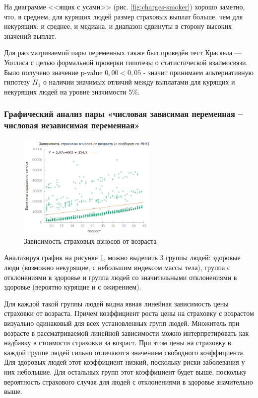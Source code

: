 \documentclass[a4paper,12pt]{article}
\begin{document}
На диаграмме <<ящик с усами>> (рис. \ref{fig:charges-smoker}) хорошо заметно, что, в среднем, для курящих людей размер страховых выплат больше, чем для некурящих: и среднее, и медиана, и диапазон сдвинуты в сторону высоких значений выплат.

Для рассматриваемой пары переменных также был проведён тест Краскела — Уоллиса с целью формальной проверки гипотезы о статистической взаимосвязи. Было получено значение p-value $0,00 < 0,05$ - значит принимаем альтернативную гипотезу $H_1$ о наличии значимых отличий между выплатами для курящих и некурящих людей на уровне значимости $5\%$.

\subsubsection{Графический анализ пары «числовая зависимая переменная – числовая независимая переменная»}

\begin{figure}[H]
	\includegraphics[width=0.6\textwidth]{../[graphics]/age-price.png}
	\centering
	\caption{Зависимость страховых взносов от возраста}
	\label{fig:age-price}
\end{figure}

Анализируя график на рисунке \ref{fig:age-price}, можно выделить 3 группы людей: здоровые люди (возможно некурящие, с небольшим индексом массы тела), группа с отклонениями в здоровье и группа людей со значительными отклонениями в здоровье (вероятно курящие и с ожирением). 

Для каждой такой группы людей видна явная линейная зависимость цены страховки от возраста. Причем коэффициент роста цены на страховку с возрастом визуально одинаковый для всех установленных групп людей. Множитель при возрасте в рассматриваемой линейной зависимости можно интерпретировать как надбавку в стоимости страховки за возраст. При этом цены на страховку в каждой группе людей сильно отличаются значением свободного коэффициента. Для здоровых людей этот коэффициент низкий, поскольку риски заболевания у них небольшие. Для остальных групп этот коэффициент будет выше, поскольку вероятность страхового случая для людей с отклонениями в здоровье значительно выше. 
\end{document}
